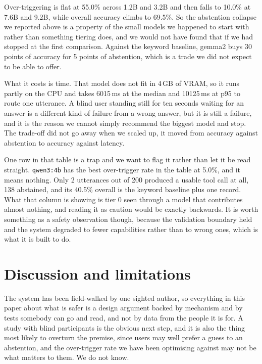 \documentclass[sigconf,nonacm]{acmart}
\newcommand{\tool}[1]{\texttt{#1}}
\begin{document}
Over-triggering is flat at 55.0\% across 1.2B and 3.2B and then falls to 10.0\%
at 7.6B and 9.2B, while overall accuracy climbs to 69.5\%. So the abstention
collapse we reported above is a property of the small models we happened to
start with rather than something tiering does, and we would not have found that
if we had stopped at the first comparison. Against the keyword baseline, gemma2
buys 30 points of accuracy for 5 points of abstention, which is a trade we did
not expect to be able to offer.

What it costs is time. That model does not fit in 4\,GB of VRAM, so it runs
partly on the CPU and takes 6015\,ms at the median and 10125\,ms at p95 to route
one utterance. A blind user standing still for ten seconds waiting for an answer
is a different kind of failure from a wrong answer, but it is still a failure,
and it is the reason we cannot simply recommend the biggest model and stop. The
trade-off did not go away when we scaled up, it moved from accuracy against
abstention to accuracy against latency.

One row in that table is a trap and we want to flag it rather than let it be
read straight. \tool{qwen3:4b} has the best over-trigger rate in the table at
5.0\%, and it means nothing. Only 2 utterances out of 200 produced a usable tool
call at all, 138 abstained, and its 40.5\% overall is the keyword baseline plus
one record. What that column is showing is tier 0 seen through a model that
contributes almost nothing, and reading it as caution would be exactly
backwards. It is worth something as a safety observation though, because the
validation boundary held and the system degraded to fewer capabilities rather
than to wrong ones, which is what it is built to do.


\section{Discussion and limitations}

The system has been field-walked by one sighted author, so everything in this
paper about what is safer is a design argument backed by mechanism and by tests
somebody can go and read, and not by data from the people it is for. A study
with blind participants is the obvious next step, and it is also the thing most
likely to overturn the premise, since users may well prefer a guess to an
abstention, and the over-trigger rate we have been optimising against may not be
what matters to them. We do not know.
\end{document}
